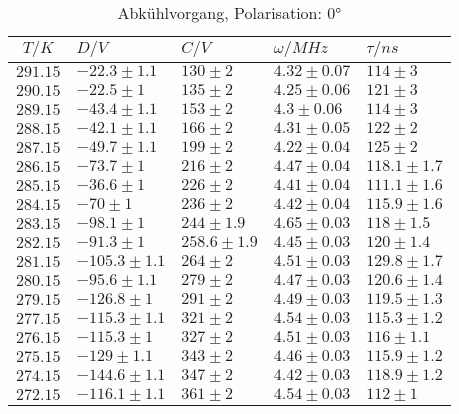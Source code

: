 \begin{table}[h!]
\scriptsize\centering
\begin{tabular}{|c|l|l|l|l|}
\hline
$T/K$&$D/V$&$C/V$&$\omega/MHz$&$\tau/ns$\\\hline\hline
$291.15$&$-22.3\pm1.1$&$130\pm2$&$4.32\pm0.07$&$114\pm3$\\\hline
$290.15$&$-22.5\pm1$&$135\pm2$&$4.25\pm0.06$&$121\pm3$\\\hline
$289.15$&$-43.4\pm1.1$&$153\pm2$&$4.3\pm0.06$&$114\pm3$\\\hline
$288.15$&$-42.1\pm1.1$&$166\pm2$&$4.31\pm0.05$&$122\pm2$\\\hline
$287.15$&$-49.7\pm1.1$&$199\pm2$&$4.22\pm0.04$&$125\pm2$\\\hline
$286.15$&$-73.7\pm1$&$216\pm2$&$4.47\pm0.04$&$118.1\pm1.7$\\\hline
$285.15$&$-36.6\pm1$&$226\pm2$&$4.41\pm0.04$&$111.1\pm1.6$\\\hline
$284.15$&$-70\pm1$&$236\pm2$&$4.42\pm0.04$&$115.9\pm1.6$\\\hline
$283.15$&$-98.1\pm1$&$244\pm1.9$&$4.65\pm0.03$&$118\pm1.5$\\\hline
$282.15$&$-91.3\pm1$&$258.6\pm1.9$&$4.45\pm0.03$&$120\pm1.4$\\\hline
$281.15$&$-105.3\pm1.1$&$264\pm2$&$4.51\pm0.03$&$129.8\pm1.7$\\\hline
$280.15$&$-95.6\pm1.1$&$279\pm2$&$4.47\pm0.03$&$120.6\pm1.4$\\\hline
$279.15$&$-126.8\pm1$&$291\pm2$&$4.49\pm0.03$&$119.5\pm1.3$\\\hline
$277.15$&$-115.3\pm1.1$&$321\pm2$&$4.54\pm0.03$&$115.3\pm1.2$\\\hline
$276.15$&$-115.3\pm1$&$327\pm2$&$4.51\pm0.03$&$116\pm1.1$\\\hline
$275.15$&$-129\pm1.1$&$343\pm2$&$4.46\pm0.03$&$115.9\pm1.2$\\\hline
$274.15$&$-144.6\pm1.1$&$347\pm2$&$4.42\pm0.03$&$118.9\pm1.2$\\\hline
$272.15$&$-116.1\pm1.1$&$361\pm2$&$4.54\pm0.03$&$112\pm1$\\\hline
\end{tabular}
\caption{Abkühlvorgang, Polarisation: 0°\label{cold0}}
\end{table}
